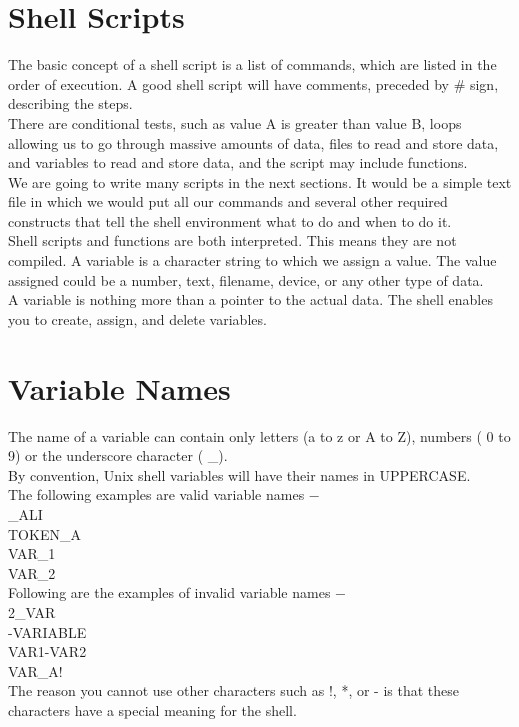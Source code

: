 \documentclass{article}
\begin{document}
\section*{Shell Scripts}
The basic concept of a shell script is a list of commands, which are listed in the order of execution. A good shell script will have comments, preceded by # sign, describing the steps.\\
There are conditional tests, such as value A is greater than value B, loops allowing us to go through massive amounts of data, files to read and store data, and variables to read and store data, and the script may include functions.\\
We are going to write many scripts in the next sections. It would be a simple text file in which we would put all our commands and several other required constructs that tell the shell environment what to do and when to do it.\\
Shell scripts and functions are both interpreted. This means they are not compiled.
A variable is a character string to which we assign a value. The value assigned could be a number, text, filename, device, or any other type of data.\\
A variable is nothing more than a pointer to the actual data. The shell enables you to create, assign, and delete variables.\\

\section*{Variable Names}
The name of a variable can contain only letters (a to z or A to Z), numbers ( 0 to 9) or the underscore character ( \_).\\
By convention, Unix shell variables will have their names in UPPERCASE.\\
The following examples are valid variable names −\\
\_ALI\\
TOKEN\_A\\
VAR\_1\\
VAR\_2\\
Following are the examples of invalid variable names −\\
2\_VAR\\
-VARIABLE\\
VAR1-VAR2\\
VAR\_A!\\
The reason you cannot use other characters such as !, *, or - is that these characters have a special meaning for the shell.\\
\end{document}
